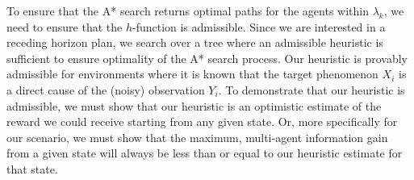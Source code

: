\documentclass[letterpaper, 10 pt, conference]{IEEEConference}
\begin{document}


To ensure that the A* search returns optimal paths for the agents within $\lambda_k$, we need to ensure that the $h$-function is admissible. Since we are interested in a receding horizon plan, we search over a tree where an admissible heuristic is sufficient to ensure optimality of the A* search process. Our heuristic is provably admissible for environments where it is known that the target phenomenon $X_i$ is a direct cause of the (noisy) observation $Y_i$. To demonstrate that our heuristic is admissible, we must show that our heuristic is an optimistic estimate of the reward we could receive starting from any given state. Or, more specifically for our scenario, we must show that the maximum, multi-agent information gain from a given state will always be less than or equal to our heuristic estimate for that state. 
\end{document}
